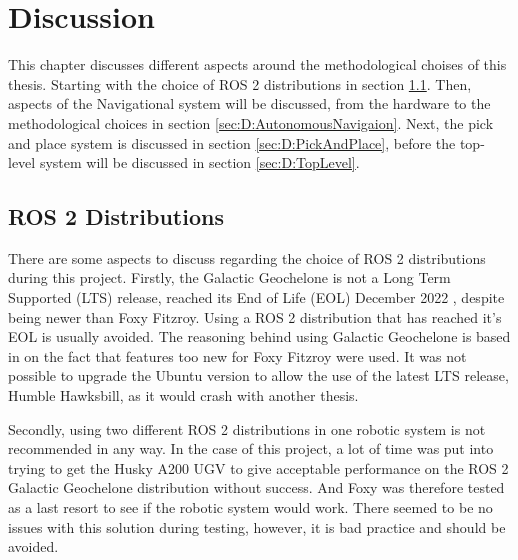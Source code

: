 \chapter{Discussion}\label{sec:Discussion}
This chapter discusses different aspects around the methodological choises of this thesis. Starting with the choice of ROS 2 distributions in section \ref{sec:D:ROS2Distros}. Then, aspects of the Navigational system will be discussed, from the hardware to the methodological choices in section \ref{sec:D:AutonomousNavigaion}. Next, the pick and place system is discussed in section \ref{sec:D:PickAndPlace}, before the top-level system will be discussed in section \ref{sec:D:TopLevel}.


\section{ROS 2 Distributions} \label{sec:D:ROS2Distros}
There are some aspects to discuss regarding the choice of ROS 2 distributions during this project. Firstly, the Galactic Geochelone is not a Long Term Supported (LTS) release, reached its End of Life (EOL) December 2022 \cite{ROS2distros}, despite being newer than Foxy Fitzroy. Using a ROS 2 distribution that has reached it's EOL is usually avoided. The reasoning behind using Galactic Geochelone is based in on the fact that features too new for Foxy Fitzroy were used. It was not possible to upgrade the Ubuntu version to allow the use of the latest LTS release, Humble Hawksbill, as it would crash with another thesis.
 
Secondly, using two different ROS 2 distributions in one robotic system is not recommended in any way. In the case of this project, a lot of time was put into trying to get the Husky A200 UGV to give acceptable performance on the ROS 2 Galactic Geochelone distribution without success. And Foxy was therefore tested as a last resort to see if the robotic system would work. There seemed to be no issues with this solution during testing, however, it is bad practice and should be avoided.



